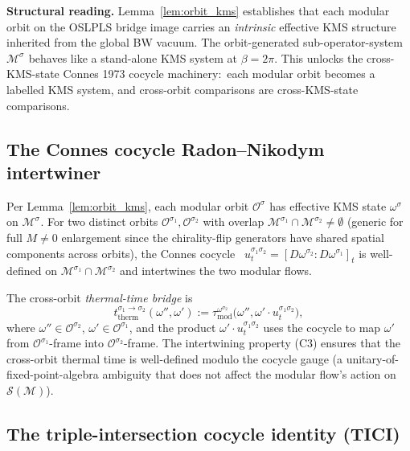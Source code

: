 \documentclass[11pt,a4paper]{article}
\theoremstyle{plain}
\theoremstyle{definition}
\newcommand{\Scal}{\mathcal{S}}
\newcommand{\Mcal}{\mathcal{M}}
\newcommand{\Ocal}{\mathcal{O}}
\newcommand{\tmod}{\tau_{\mathrm{mod}}}
\newcommand{\Morb}[1]{\Mcal^{\sigma_{#1}}}
\newcommand{\Oorb}[1]{\Ocal^{\sigma_{#1}}}
\newcommand{\omegaOrb}[1]{\omega^{\sigma_{#1}}}
\newcommand{\cocyc}[2]{u_{t}^{\sigma_{#1}\sigma_{#2}}}
\begin{document}
\textbf{Structural reading.} Lemma~\ref{lem:orbit_kms} establishes
that each modular orbit on the OSLPLS bridge image carries an
\emph{intrinsic} effective KMS structure inherited from the global BW
vacuum. The orbit-generated sub-operator-system $\Morb{}$ behaves like
a stand-alone KMS system at $\beta=2\pi$. This unlocks the
cross-KMS-state Connes 1973 cocycle machinery:\ each modular orbit
becomes a labelled KMS system, and cross-orbit comparisons are
cross-KMS-state comparisons.

\subsection{The Connes cocycle Radon--Nikodym intertwiner}
\label{sec:connes_cocycle}

Per Lemma~\ref{lem:orbit_kms}, each modular orbit $\Oorb{}$ has
effective KMS state $\omegaOrb{}$ on $\Morb{}$. For two distinct
orbits $\Oorb{1},\Oorb{2}$ with overlap
$\Morb{1}\cap\Morb{2}\ne\emptyset$ (generic for full $M\ne 0$
enlargement since the chirality-flip generators have shared spatial
components across orbits), the Connes
cocycle~\cite{connes1973} $\cocyc{1}{2}=[D\omegaOrb{2}:D\omegaOrb{1}]_{t}$
is well-defined on $\Morb{1}\cap\Morb{2}$ and intertwines the two
modular flows.

The cross-orbit \emph{thermal-time bridge} is
\begin{equation}
  t_{\mathrm{therm}}^{\sigma_{1}\to\sigma_{2}}(\omega'',\omega') := \tmod^{\omegaOrb{2}}\!\big(\omega'',\omega'\cdot\cocyc{1}{2}\big),
  \label{eq:cross_orbit_thermal_time}
\end{equation}
where $\omega''\in\Oorb{2}$, $\omega'\in\Oorb{1}$, and the product
$\omega'\cdot\cocyc{1}{2}$ uses the cocycle to map $\omega'$ from
$\Oorb{1}$-frame into $\Oorb{2}$-frame. The intertwining property (C3)
ensures that the cross-orbit thermal time is well-defined modulo the
cocycle gauge (a unitary-of-fixed-point-algebra ambiguity that does
not affect the modular flow's action on $\Scal(\Mcal)$).

\subsection{The triple-intersection cocycle identity (TICI)}
\label{sec:tici}
\end{document}
